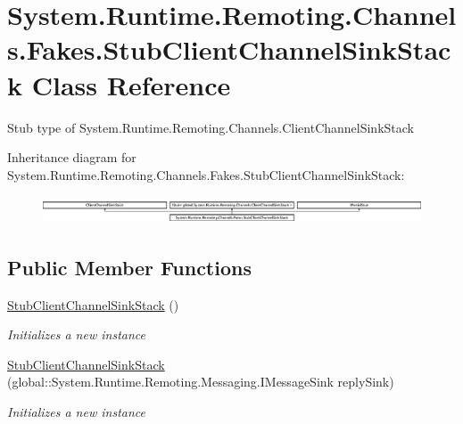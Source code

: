 \hypertarget{class_system_1_1_runtime_1_1_remoting_1_1_channels_1_1_fakes_1_1_stub_client_channel_sink_stack}{\section{System.\-Runtime.\-Remoting.\-Channels.\-Fakes.\-Stub\-Client\-Channel\-Sink\-Stack Class Reference}
\label{class_system_1_1_runtime_1_1_remoting_1_1_channels_1_1_fakes_1_1_stub_client_channel_sink_stack}
}


Stub type of System.\-Runtime.\-Remoting.\-Channels.\-Client\-Channel\-Sink\-Stack 


Inheritance diagram for System.\-Runtime.\-Remoting.\-Channels.\-Fakes.\-Stub\-Client\-Channel\-Sink\-Stack\-:\begin{figure}[H]
\begin{center}
\leavevmode
\includegraphics[height=0.833333cm]{class_system_1_1_runtime_1_1_remoting_1_1_channels_1_1_fakes_1_1_stub_client_channel_sink_stack}
\end{center}
\end{figure}
\subsection*{Public Member Functions}
\begin{DoxyCompactItemize}
\item 
\hyperlink{class_system_1_1_runtime_1_1_remoting_1_1_channels_1_1_fakes_1_1_stub_client_channel_sink_stack_af9ea2825d0759b58ef1ffcac7d1c69aa}{Stub\-Client\-Channel\-Sink\-Stack} ()
\begin{DoxyCompactList}\small\item\em Initializes a new instance\end{DoxyCompactList}\item 
\hyperlink{class_system_1_1_runtime_1_1_remoting_1_1_channels_1_1_fakes_1_1_stub_client_channel_sink_stack_aa7bfcf987eb55b6b75ecbfadf0a28e6c}{Stub\-Client\-Channel\-Sink\-Stack} (global\-::\-System.\-Runtime.\-Remoting.\-Messaging.\-I\-Message\-Sink reply\-Sink)
\begin{DoxyCompactList}\small\item\em Initializes a new instance\end{DoxyCompactList}\end{DoxyCompactItemize}
